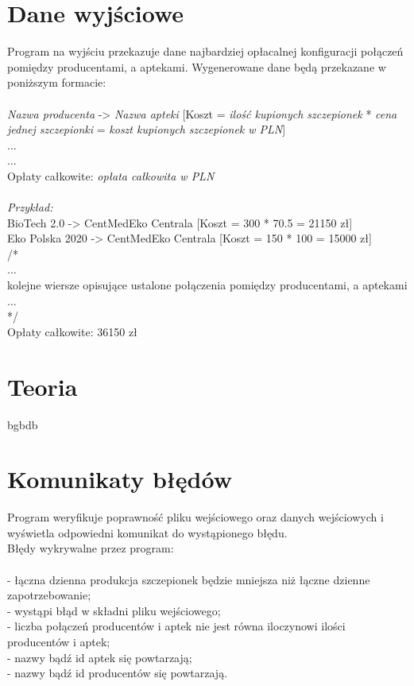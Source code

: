 \documentclass[]{article}
\begin{document}
\clearpage

\section{Dane wyjściowe}
Program na wyjściu przekazuje dane najbardziej opłacalnej konfiguracji połączeń pomiędzy producentami,
a aptekami. Wygenerowane dane będą przekazane w poniższym formacie:\\\\
\textit{Nazwa producenta} -> \textit{Nazwa apteki} [Koszt = \textit{ilość kupionych szczepionek} * \textit{cena jednej szczepionki} = \textit{koszt kupionych szczepionek w PLN}]\\
...\\
...\\
Opłaty całkowite: \textit{opłata całkowita w PLN}\\\\
\emph{Przykład:}\\
BioTech 2.0\hspace{7mm} -> CentMedEko Centrala [Koszt = 300 * 70.5 = 21150 zł]\\
Eko Polska 2020  -> CentMedEko Centrala [Koszt = 150 * 100 = 15000 zł]\\
/*\\
...\\
kolejne wiersze opisujące ustalone połączenia pomiędzy producentami, a aptekami\\
...\\
*/\\
Opłaty całkowite: 36150 zł\\

\section{Teoria}
bgbdb


\section{Komunikaty błędów}
Program weryfikuje poprawność pliku wejściowego oraz danych wejściowych i wyświetla odpowiedni komunikat do wystąpionego błędu. \\ Błędy wykrywalne przez program:\\\\
- łączna dzienna produkcja szczepionek będzie mniejsza niż łączne dzienne zapotrzebowanie;\\
- wystąpi błąd w składni pliku wejściowego;\\
- liczba połączeń producentów i aptek nie jest równa iloczynowi ilości producentów i aptek;\\
- nazwy bądź id aptek się powtarzają;\\
- nazwy bądź id producentów się powtarzają.\\
\end{document}
